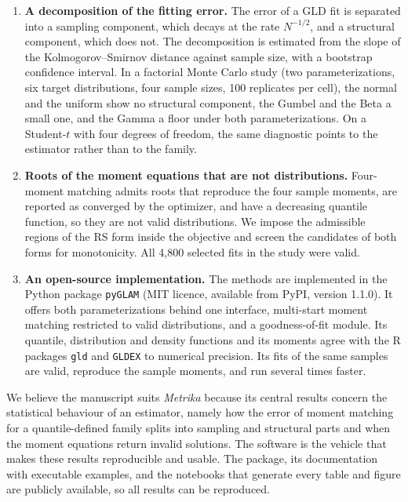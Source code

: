 \documentclass[11pt,a4paper]{article}
\begin{document}
\begin{enumerate}[leftmargin=*, itemsep=0.5em]
\item \textbf{A decomposition of the fitting error.} The error of a GLD fit is separated into a sampling component, which decays at the rate $N^{-1/2}$, and a structural component, which does not. The decomposition is estimated from the slope of the Kolmogorov--Smirnov distance against sample size, with a bootstrap confidence interval. In a factorial Monte Carlo study (two parameterizations, six target distributions, four sample sizes, 100 replicates per cell), the normal and the uniform show no structural component, the Gumbel and the Beta a small one, and the Gamma a floor under both parameterizations. On a Student-$t$ with four degrees of freedom, the same diagnostic points to the estimator rather than to the family.

\item \textbf{Roots of the moment equations that are not distributions.} Four-moment matching admits roots that reproduce the four sample moments, are reported as converged by the optimizer, and have a decreasing quantile function, so they are not valid distributions. We impose the admissible regions of the RS form inside the objective and screen the candidates of both forms for monotonicity. All 4{,}800 selected fits in the study were valid.

\item \textbf{An open-source implementation.} The methods are implemented in the Python package \texttt{pyGLAM} (MIT licence, available from PyPI, version 1.1.0). It offers both parameterizations behind one interface, multi-start moment matching restricted to valid distributions, and a goodness-of-fit module. Its quantile, distribution and density functions and its moments agree with the R packages \texttt{gld} and \texttt{GLDEX} to numerical precision. Its fits of the same samples are valid, reproduce the sample moments, and run several times faster.
\end{enumerate}

We believe the manuscript suits \emph{Metrika} because its central results concern the statistical behaviour of an estimator, namely how the error of moment matching for a quantile-defined family splits into sampling and structural parts and when the moment equations return invalid solutions. The software is the vehicle that makes these results reproducible and usable. The package, its documentation with executable examples, and the notebooks that generate every table and figure are publicly available, so all results can be reproduced.
\end{document}
